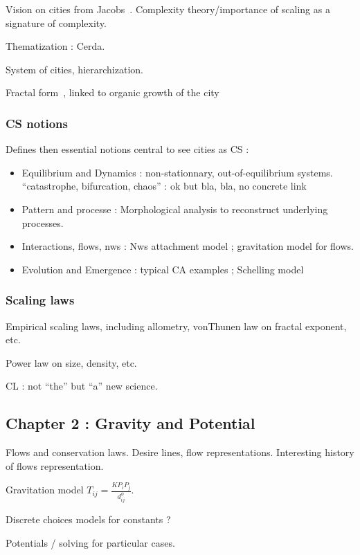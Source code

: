 Vision on cities from Jacobs~\cite{Jac56}. Complexity theory/importance of scaling as a signature of complexity.

Thematization : Cerda.

System of cities, hierarchization.

Fractal form~\cite{FractalCities}, linked to organic growth of the city

\subsubsection*{CS notions}

Defines then essential notions central to see cities as CS :
\begin{itemize}
\item Equilibrium and Dynamics : non-stationnary, out-of-equilibrium systems. ``catastrophe, bifurcation, chaos'' : ok but bla, bla, no concrete link
\item Pattern and processe : Morphological analysis to reconstruct underlying processes.
\item Interactions, flows, nws : Nws attachment model ; gravitation model for flows.
\item Evolution and Emergence : typical CA examples ; Schelling model~\cite{schelling1969models}
\end{itemize}


\subsubsection*{Scaling laws}

Empirical scaling laws, including allometry, vonThunen law on fractal exponent, etc.

Power law on size, density, etc.

CL : not ``the'' but ``a'' new science.



\subsection{Chapter 2 : Gravity and Potential}

Flows and conservation laws. Desire lines, flow representations. Interesting history of flows representation.

Gravitation model $T_{ij}=\frac{KP_iP_j}{d_{ij}^{\phi}}$.

Discrete choices models for constants ?

Potentials / solving for particular cases.

